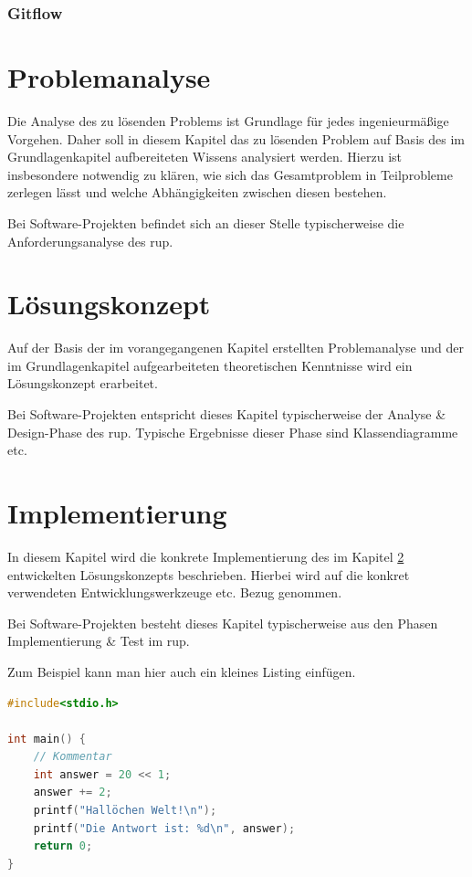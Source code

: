 \documentclass[oneside]{ausarbeitung}
\begin{document}
\subsection{Gitflow}
\label{sub:gitflow}

\chapter{Problemanalyse}
\label{cha:problemanalyse}

Die Analyse des zu lösenden Problems ist Grundlage für jedes 
ingenieurmäßige Vorgehen. Daher soll in diesem Kapitel das zu lösenden 
Problem auf Basis des im Grundlagenkapitel aufbereiteten Wissens 
analysiert werden. Hierzu ist insbesondere notwendig zu klären, wie sich 
das Gesamtproblem in Teilprobleme zerlegen lässt und welche 
Abhängigkeiten zwischen diesen bestehen.

Bei Software-Projekten befindet sich an dieser Stelle typischerweise die 
Anforderungsanalyse des \ac{rup}.

\chapter{Lösungskonzept}
\label{cha:loesungskonzept}

Auf der Basis der im vorangegangenen Kapitel erstellten Problemanalyse 
und der im Grundlagenkapitel aufgearbeiteten theoretischen Kenntnisse 
wird ein Lösungskonzept erarbeitet.

Bei Software-Projekten entspricht dieses Kapitel typischerweise der 
Analyse \& Design-Phase des \ac{rup}. Typische Ergebnisse dieser Phase sind 
Klassendiagramme etc.

\chapter{Implementierung}
\label{cha:implementierung}

In diesem Kapitel wird die konkrete Implementierung des im Kapitel
\ref{cha:loesungskonzept} entwickelten Lösungskonzepts beschrieben.
Hierbei wird auf die konkret verwendeten Entwicklungswerkzeuge etc. 
Bezug genommen.

Bei Software-Projekten besteht dieses Kapitel typischerweise aus den 
Phasen Implementierung \& Test im \ac{rup}.

Zum Beispiel kann man hier auch ein kleines Listing einfügen.

\begin{lstlisting}[language=c,%
                   caption={Überschrift des Quelltexts}]
#include<stdio.h>

int main() {
    // Kommentar
    int answer = 20 << 1;
    answer += 2;
    printf("Hallöchen Welt!\n");
    printf("Die Antwort ist: %d\n", answer);
    return 0;
}
\end{lstlisting}
\end{document}
